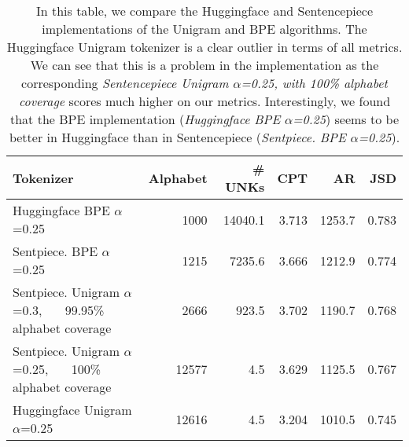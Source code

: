 \begin{table}
\caption{In this table, we compare the Huggingface and Sentencepiece implementations of the Unigram and BPE algorithms. The Huggingface Unigram tokenizer is a clear outlier in terms of all metrics. We can see that this is a problem in the implementation as the corresponding \textit{Sentencepiece Unigram $\alpha$=0.25, with 100\% alphabet coverage} scores much higher on our metrics. Interestingly, we found that the BPE implementation (\textit{Huggingface BPE $\alpha$=0.25}) seems to be better in Huggingface than in Sentencepiece (\textit{Sentpiece. BPE $\alpha$=0.25}).}
\label{tab:hugg_vs_sentpiece}
\begin{tabular}{lrrrrr}
\toprule
Tokenizer & Alphabet & \# UNKs & CPT & AR & JSD \\
\midrule
Huggingface BPE $\alpha$=0.25 & 1000 & 14040.1 & 3.713 & 1253.7 & 0.783 \\
Sentpiece. BPE $\alpha$=0.25 & 1215 & 7235.6 & 3.666 & 1212.9 & 0.774 \\
\makecell[l]{Sentpiece. Unigram $\alpha$=0.3, \\ ~~~99.95\% alphabet coverage} & 2666 & 923.5 & 3.702 & 1190.7 & 0.768 \\
\makecell[l]{Sentpiece. Unigram $\alpha$=0.25, \\ ~~~100\% alphabet coverage} & 12577 & 4.5 & 3.629 & 1125.5 & 0.767 \\
Huggingface Unigram $\alpha$=0.25 & 12616 & 4.5 & 3.204 & 1010.5 & 0.745 \\
\bottomrule
\end{tabular}
\end{table}
